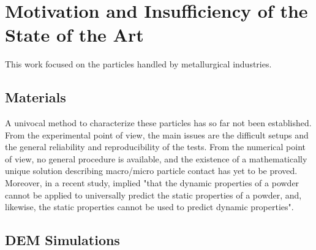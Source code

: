 
\chapter{Motivation and Insufficiency of the State of the Art}
\label{cap:insufficiency}

This work focused on the particles handled by metallurgical industries.

\section{Materials}
\label{sec:materials}

A univocal
method to characterize these particles has so far not been established.
From the experimental point of view, the main issues are the difficult setups and the general 
reliability and reproducibility of the tests. 
From the numerical point of view, no general procedure is available, and the existence of a 
mathematically unique solution describing macro/micro particle contact has yet to be proved.
Moreover, in a recent study, \citet{RefWorks:56} implied "that the dynamic properties of a 
powder cannot be applied to universally predict the static properties of a powder, and, likewise, 
the static properties cannot be used to predict dynamic properties".\\

\section{DEM Simulations}
\label{sec:demsimulations}

